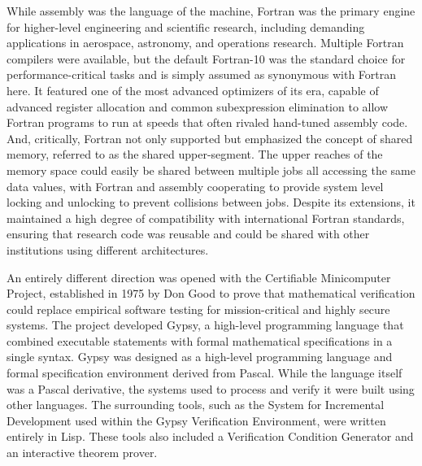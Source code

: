 While assembly was the language of the machine, Fortran was the primary engine for higher-level engineering and scientific research, including demanding applications in aerospace, astronomy, and operations research. Multiple Fortran compilers were available, but the default Fortran-10 was the standard choice for performance-critical tasks and is simply assumed as synonymous with Fortran here. It featured one of the most advanced optimizers of its era, capable of advanced register allocation and common subexpression elimination to allow Fortran programs to run at speeds that often rivaled hand-tuned assembly code. And, critically, Fortran not only supported but emphasized the concept of shared memory, referred to as the shared upper-segment. The upper reaches of the memory space could easily be shared between multiple jobs all accessing the same data values, with Fortran and assembly cooperating to provide system level locking and unlocking to prevent collisions between jobs. Despite its extensions, it maintained a high degree of compatibility with international Fortran standards, ensuring that research code was reusable and could be shared with other institutions using different architectures.

An entirely different direction was opened with the Certifiable Minicomputer Project, established in 1975 by Don Good to prove that mathematical verification could replace empirical software testing for mission-critical and highly secure systems. The project developed Gypsy, a high-level programming language that combined executable statements with formal mathematical specifications in a single syntax. Gypsy was designed as a high-level programming language and formal specification environment derived from Pascal. While the language itself was a Pascal derivative, the systems used to process and verify it were built using other languages. The surrounding tools, such as the System for Incremental Development used within the Gypsy Verification Environment, were written entirely in Lisp. These tools also included a Verification Condition Generator and an interactive theorem prover. 


